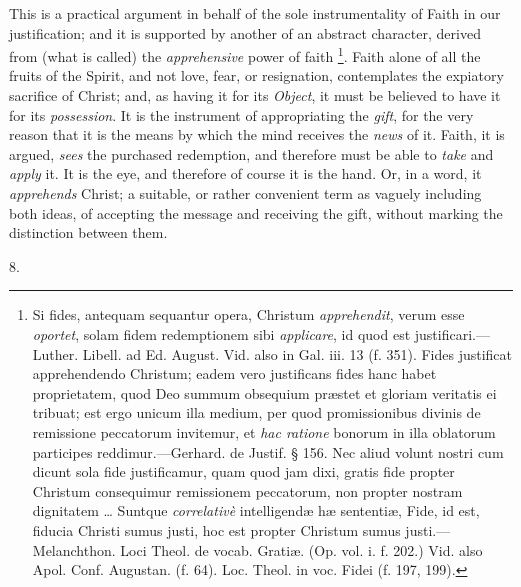 This is a practical argument in behalf of the sole instrumentality
of Faith in our justification; and it is supported by another of
an abstract character, derived from (what is called) the \emph{apprehensive}
power of faith \footnote{Si fides,
antequam sequantur opera, Christum \emph{apprehendit}, verum esse \emph{oportet},
solam fidem redemptionem sibi \emph{applicare}, id quod est justificari.—Luther.
Libell. ad Ed. August. Vid. also in Gal. iii. 13 (f. 351). Fides
justificat apprehendendo Christum; eadem vero justificans fides hanc
habet proprietatem, quod Deo summum obsequium præstet et gloriam
veritatis ei tribuat; est ergo unicum illa medium, per quod
promissionibus divinis de remissione peccatorum invitemur, et \emph{hac
ratione} bonorum in illa oblatorum participes reddimur.—Gerhard.
de Justif. § 156. Nec aliud volunt nostri cum dicunt sola fide
justificamur, quam quod jam dixi, gratis fide propter Christum
consequimur remissionem peccatorum, non propter nostram dignitatem …
Suntque \emph{correlativè} intelligendæ hæ sententiæ, Fide, id est,
fiducia Christi sumus justi, hoc est propter Christum sumus justi.—Melanchthon.
Loci Theol. de vocab. Gratiæ. (Op. vol. i. f. 202.) Vid. also Apol.
Conf. Augustan. (f. 64). Loc. Theol. in voc. Fidei (f. 197, 199).}. Faith alone of all the fruits of the Spirit,
and not love, fear, or resignation, contemplates the expiatory
sacrifice of Christ; and, as having it for its \emph{Object}, it must
be believed to have it for its \emph{possession}. It is the instrument
of appropriating the \emph{gift}, for the very reason that it is the
means by which the mind receives the \emph{news} of it. Faith, it is
argued, \emph{sees} the purchased redemption, and therefore must be
able to \emph{take} and \emph{apply} it. It is the eye, and therefore
of course it is the hand. Or, in a word, it \emph{apprehends} Christ;
a suitable, or rather convenient term as vaguely including both ideas,
of accepting the message and receiving the gift, without marking the
distinction between them.

8.


